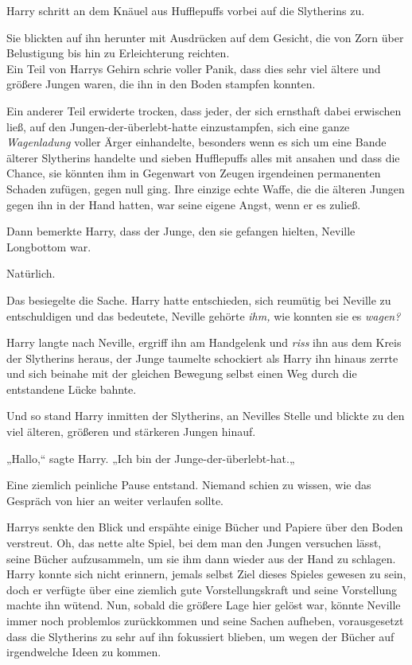{Harry schritt an dem Knäuel aus Hufflepuffs vorbei auf die Slytherins zu.

Sie blickten auf ihn herunter mit Ausdrücken auf dem Gesicht, die von Zorn über Belustigung bis hin zu Erleichterung reichten.\\ Ein Teil von Harrys Gehirn schrie voller Panik, dass dies sehr viel ältere und größere Jungen waren, die ihn in den Boden stampfen konnten.

Ein anderer Teil erwiderte trocken, dass jeder, der sich ernsthaft dabei erwischen ließ, auf den Jungen-der-überlebt-hatte einzustampfen, sich eine ganze \emph{Wagenladung} voller Ärger einhandelte, besonders wenn es sich um eine Bande älterer Slytherins handelte und sieben Hufflepuffs alles mit ansahen und dass die Chance, sie könnten ihm in Gegenwart von Zeugen irgendeinen permanenten Schaden zufügen, gegen null ging. Ihre einzige echte Waffe, die die älteren Jungen gegen ihn in der Hand hatten, war seine eigene Angst, wenn er es zuließ.

Dann bemerkte Harry, dass der Junge, den sie gefangen hielten, Neville Longbottom war.

Natürlich.

Das besiegelte die Sache. Harry hatte entschieden, sich reumütig bei Neville zu entschuldigen und das bedeutete, Neville gehörte \emph{ihm,} wie konnten sie es \emph{wagen?}

Harry langte nach Neville, ergriff ihn am Handgelenk und \emph{riss} ihn aus dem Kreis der Slytherins heraus, der Junge taumelte schockiert als Harry ihn hinaus zerrte und sich beinahe mit der gleichen Bewegung selbst einen Weg durch die entstandene Lücke bahnte.

Und so stand Harry inmitten der Slytherins, an Nevilles Stelle und blickte zu den viel älteren, größeren und stärkeren Jungen hinauf.

„Hallo,“ sagte Harry. „Ich bin der Junge-der-überlebt-hat.„

Eine ziemlich peinliche Pause entstand. Niemand schien zu wissen, wie das Gespräch von hier an weiter verlaufen sollte.

Harrys senkte den Blick und erspähte einige Bücher und Papiere über den Boden verstreut. Oh, das nette alte Spiel, bei dem man den Jungen versuchen lässt, seine Bücher aufzusammeln, um sie ihm dann wieder aus der Hand zu schlagen. Harry konnte sich nicht erinnern, jemals selbst Ziel dieses Spieles gewesen zu sein, doch er verfügte über eine ziemlich gute Vorstellungskraft und seine Vorstellung machte ihn wütend. Nun, sobald die größere Lage hier gelöst war, könnte Neville immer noch problemlos zurückkommen und seine Sachen aufheben, vorausgesetzt dass die Slytherins zu sehr auf ihn fokussiert blieben, um wegen der Bücher auf irgendwelche Ideen zu kommen.

}
